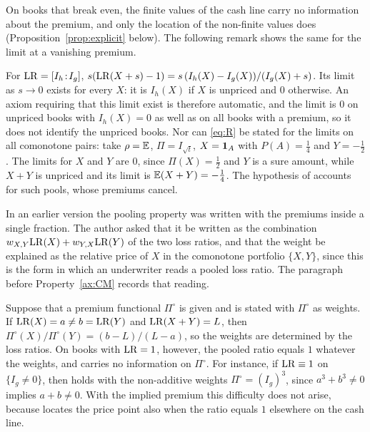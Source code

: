 On books that break even, the finite values of the cash line carry no information about the premium, and only the
location of the non-finite values does (Proposition~\ref{prop:explicit} below). The following remark shows the same
for the limit at a vanishing premium.

\begin{remark}\label{rem:limzero}
For $\mathrm{LR}=[I_h\!:\!I_g]$, $s(\mathrm{LR}(X+s)-1)=s\,(I_h(X)-I_g(X))/(I_g(X)+s)$. Its limit as $s\to0$ exists for every
$X$: it is $I_h(X)$ if $X$ is unpriced and $0$ otherwise. An axiom requiring that this limit exist is therefore
automatic, and the limit is $0$ on unpriced books with $I_h(X)=0$ as well as on all books with a premium, so it
does not identify the unpriced books. Nor can \eqref{eq:R} be stated for the limits on all comonotone pairs: take
$\rho=\mathbb E$, $\Pi=I_{\sqrt t}$, $X=\mathbf 1_A$ with $P(A)=\tfrac14$ and $Y=-\tfrac12$. The limits for $X$ and $Y$ are $0$,
since $\Pi(X)=\tfrac12$ and $Y$ is a sure amount, while $X+Y$ is unpriced and its limit is $\mathbb E(X+Y)=-\tfrac14$. The
hypothesis of \axR{} accounts for such pools, whose premiums cancel.
\end{remark}

\begin{discussion}
In an earlier version the pooling property was written with the premiums inside a single fraction. The author
asked that it be written as the combination $w_{X,Y}\mathrm{LR}(X)+w_{Y,X}\mathrm{LR}(Y)$ of the two loss ratios, and that the
weight be explained as the relative price of $X$ in the comonotone portfolio $\{X,Y\}$, since this is the form in
which an underwriter reads a pooled loss ratio. The paragraph before Property~\ref{ax:CM} records that reading.
\end{discussion}

\begin{remark}\label{rem:primitive}
Suppose that a premium functional $\Pi^\circ$ is given and \axCM{} is stated with $\Pi^\circ$ as weights. If
$\mathrm{LR}(X)=a\ne b=\mathrm{LR}(Y)$ and $\mathrm{LR}(X+Y)=L$, then $\Pi^\circ(X)/\Pi^\circ(Y)=(b-L)/(L-a)$, so the weights are determined
by the loss ratios. On books with $\mathrm{LR}=1$, however, the pooled ratio equals $1$ whatever the weights, and \axCM{}
carries no information on $\Pi^\circ$. For instance, if $\mathrm{LR}\equiv1$ on $\{I_g\ne0\}$, then \axCM{} holds with the
non-additive weights $\Pi^\circ=(I_g)^3$, since $a^3+b^3\ne0$ implies $a+b\ne0$. With the implied premium this
difficulty does not arise, because \axP{} locates the price point also when the ratio equals $1$ elsewhere on
the cash line.
\end{remark}

